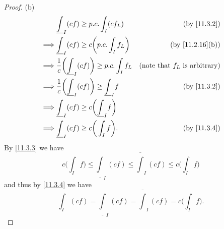 \begin{proof}{(b)}
\begin{align*}
             & \underline{\int}_I (cf) \geq p.c. \int_I (c f_L)                          & \text{(by \cref{11.3.2})}               \\
    \implies & \underline{\int}_I (cf) \geq c \bigg(p.c. \int_I f_L\bigg)                & \text{(by \cref{11.2.16}(b))}           \\
    \implies & \frac{1}{c} \bigg(\underline{\int}_I (cf)\bigg) \geq p.c. \int_I f_L      & \text{(note that \(f_L\) is arbitrary)} \\
    \implies & \frac{1}{c} \bigg(\underline{\int}_I (cf)\bigg) \geq \underline{\int}_I f & \text{(by \cref{11.3.2})}               \\
    \implies & \underline{\int}_I (cf) \geq c\bigg(\underline{\int}_I f\bigg)                                                      \\
    \implies & \underline{\int}_I (cf) \geq c\bigg(\int_I f\bigg).                       & \text{(by \cref{11.3.4})}
  \end{align*}
  By \cref{11.3.3} we have
  \[
    c\bigg(\int_I f\bigg) \leq \underline{\int}_I (cf) \leq \overline{\int}_I (cf) \leq c\bigg(\int_I f\bigg)
  \]
  and thus by \cref{11.3.4} we have
  \[
    \int_I (cf) = \underline{\int}_I (cf) = \overline{\int}_I (cf) = c\bigg(\int_I f\bigg).
  \]


\end{proof}
